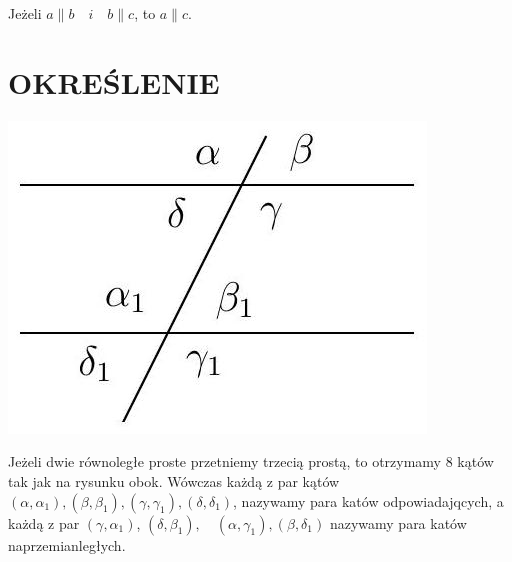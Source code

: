 \documentclass[10pt]{article}
\begin{document}
Jeżeli \(a\|b \quad i \quad b\| c\), to \(a \| c\).

\section*{OKREŚLENIE}
\begin{center}
\includegraphics[max width=\textwidth]{2024_11_21_8f01584889ff06348ae7g-189(2)}
\end{center}

Jeżeli dwie równoległe proste przetniemy trzecią prostą, to otrzymamy 8 kątów tak jak na rysunku obok. Wówczas każdą z par kątów \(\left(\alpha, \alpha_{1}\right),\left(\beta, \beta_{1}\right),\left(\gamma, \gamma_{1}\right),\left(\delta, \delta_{1}\right)\), nazywamy para katów odpowiadajqcych, a każdą z par \(\left(\gamma, \alpha_{1}\right)\), \(\left(\delta, \beta_{1}\right), \quad\left(\alpha, \gamma_{1}\right),\left(\beta, \delta_{1}\right)\) nazywamy para katów naprzemianległych.
\end{document}
